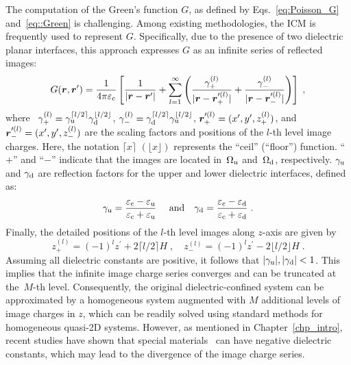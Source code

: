 The computation of the Green's function $G$, 
as defined by Eqs.~\eqref{eq:Poisson_G} and~\eqref{eq::Green} is challenging. 
Among existing methodologies, the ICM is frequently used to represent $G$. Specifically, due to the presence of two dielectric planar interfaces, this approach expresses $G$ as an infinite series of reflected images:
\begin{equation}\label{eq:ICM}
    G(\boldsymbol{r},\boldsymbol{r}')=\frac{1}{4 \pi \varepsilon_{\mathrm{c}}} \left[ \frac{1}{\lvert\boldsymbol{r} - \boldsymbol{r}^\prime\rvert} + \sum_{l = 1}^\infty \left( \frac{\gamma_{+}^{(l)}}{\lvert\boldsymbol{r} - \boldsymbol{r}_{+}^{\prime(l)}\rvert} + \frac{\gamma_{-}^{(l)}}{\lvert\boldsymbol{r} - \boldsymbol{r}_{-}^{\prime (l)}\rvert} \right) \right]\;,
\end{equation}
where~%
$\gamma_{+}^{(l)} = \gamma_{\text{u}}^{\lceil l/2 \rceil} \gamma_{\text{d}}^{\lfloor l/2 \rfloor}$, $\gamma_{-}^{(l)} = \gamma_{\text{d}}^{\lceil l/2 \rceil} \gamma_{\text{u}}^{\lfloor l/2 \rfloor}$, $\boldsymbol{r}_{+}^{\prime(l)} = (x^\prime, y^\prime, z_{+}^{(l)})$, and $\boldsymbol{r}_{-}^{\prime(l)} = (x^\prime, y^\prime, z_{-}^{(l)})$ are the scaling factors and positions of the $l$-th level image charges.
Here, the notation $\lceil x\rceil$ $(\lfloor x\rfloor)$ represents the ``ceil'' (``floor'') function. ``$+$'' and ``$-$'' indicate that the images are located in~$\Omega_{\mathrm{u}}$ and~$\Omega_{\mathrm{d}}$, respectively. $\gamma_{\text{u}}$ and $\gamma_{\text{d}}$ are reflection factors for the upper and lower dielectric interfaces, defined as:
\begin{equation}
    \gamma_{\mathrm{u}} = \frac{\varepsilon_{\mathrm{c}} - \varepsilon_{\mathrm{u}}}{\varepsilon_{\mathrm{c}} + \varepsilon_{\mathrm{u}}}~\quad\text{and}\quad
    \gamma_{\mathrm{d}} = \frac{\varepsilon_{\mathrm{c}} - \varepsilon_{\mathrm{d}}}{\varepsilon_{\mathrm{c}} + \varepsilon_{\mathrm{d}}}\;.
\end{equation}
Finally, the detailed positions of the $l$-th level images along $z$-axis are given by 
\begin{equation}\label{eq:z_l}
    z_{+}^{(l)} = (-1)^l z^\prime + 2\lceil l/2\rceil H \;,\quad z_{-}^{(l)} = (-1)^l z^\prime - 2\lfloor l/2\rfloor H \;.
\end{equation}
Assuming all dielectric constants are positive, it follows that $\lvert\gamma_{\mathrm{u}}\rvert,\lvert\gamma_{\text{d}}\rvert< 1$. 
This implies that the infinite image charge series converges and can be truncated at the~$M$-th level. 
Consequently, the original dielectric-confined system can be approximated by a homogeneous system augmented with $M$ additional levels of image charges in $z$, which can be readily solved using standard methods for homogeneous quasi-2D systems.
However, as mentioned in Chapter~\ref{chp_intro}, recent studies have shown that special materials~\cite{Kornyshev1996Static, Schlaich2016Water, Kornyshev2021Nonlocal} can have negative dielectric constants, which may lead to the divergence of the image charge series.

